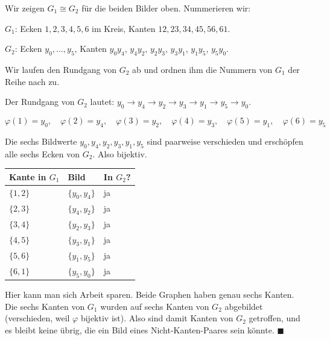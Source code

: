 \begin{merksatz}
Wir zeigen $G_1 \cong G_2$ für die beiden Bilder oben. Nummerieren wir:

$G_1$: Ecken $1,2,3,4,5,6$ im Kreis, Kanten $12, 23, 34, 45, 56, 61$.

$G_2$: Ecken $y_0, \ldots, y_5$, Kanten $y_0y_4$, $y_4y_2$, $y_2y_3$, $y_3y_1$, $y_1y_5$, $y_5y_0$.

Wir laufen den Rundgang von $G_2$ ab und ordnen ihm die Nummern von $G_1$ der Reihe nach zu.

Der Rundgang von $G_2$ lautet: $y_0 \to y_4 \to y_2 \to y_3 \to y_1 \to y_5 \to y_0$.

\[ \varphi(1) = y_0,\quad \varphi(2) = y_4,\quad \varphi(3) = y_2,\quad \varphi(4) = y_3,\quad \varphi(5) = y_1,\quad \varphi(6) = y_5 \]

Die sechs Bildwerte $y_0, y_4, y_2, y_3, y_1, y_5$ sind paarweise verschieden und erschöpfen alle sechs Ecken von $G_2$. Also bijektiv.

\begin{center}
{\small
\renewcommand{\arraystretch}{1.35}
\begin{tabular}{@{}P{1.6cm}P{2.4cm}P{2.6cm}@{}}
\toprule
\textbf{Kante in $G_1$} & \textbf{Bild} & \textbf{In $G_2$?}\\
\midrule
$\{1,2\}$ & $\{y_0, y_4\}$ & ja\\
$\{2,3\}$ & $\{y_4, y_2\}$ & ja\\
$\{3,4\}$ & $\{y_2, y_3\}$ & ja\\
$\{4,5\}$ & $\{y_3, y_1\}$ & ja\\
$\{5,6\}$ & $\{y_1, y_5\}$ & ja\\
$\{6,1\}$ & $\{y_5, y_0\}$ & ja\\
\bottomrule
\end{tabular}}
\end{center}

Hier kann man sich Arbeit sparen. Beide Graphen haben genau sechs Kanten. Die sechs Kanten von $G_1$ wurden auf sechs  Kanten von $G_2$ abgebildet (verschieden, weil $\varphi$ bijektiv ist). Also sind damit  Kanten von $G_2$ getroffen, und es bleibt keine übrig, die ein Bild eines Nicht-Kanten-Paares sein könnte. $\blacksquare$

\begin{center}
\begin{minipage}{0.86\textwidth}
\end{minipage}
\end{center}
\end{merksatz}

